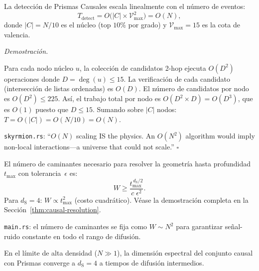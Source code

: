 \documentclass[11pt, a4paper, openany]{book}
\newcommand{\dS}{d_{\mathrm{S}}}
\renewenvironment{proof}[1][Demostraci\'on]{%
  \par\noindent\textit{#1.}\quad
}{\hfill$\square$\par\medskip}
\begin{document}
\begin{theorem}
\label{thm:app-on}
La detecci\'on de Prismas Causales escala linealmente con el
n\'umero de eventos:
\begin{equation}
  T_{\text{detect}}
  = O\bigl(|C| \times \mathcal{V}_{\max}^2\bigr)
  = O(N),
  \label{eq:thm-on}
\end{equation}
donde $|C| = N/10$ es el n\'ucleo (top $10\%$ por grado) y
$\mathcal{V}_{\max} = 15$ es la cota de valencia.
\end{theorem}

\begin{proof}
Para cada nodo n\'ucleo $u$, la colecci\'on de candidatos 2-hop
ejecuta $O(D^2)$ operaciones donde $D = \deg(u) \leq 15$. La
verificaci\'on de cada candidato (intersecci\'on de listas
ordenadas) es $O(D)$. El n\'umero de candidatos por nodo es
$O(D^2) \leq 225$. As\'i, el trabajo total por nodo es
$O(D^2 \times D) = O(D^3)$, que es $O(1)$ puesto que
$D \leq 15$. Sumando sobre $|C|$ nodos:
$T = O(|C|) = O(N/10) = O(N)$.

\medskip\noindent
\texttt{skyrmion.rs}: ``$O(N)$ scaling IS the physics.
An $O(N^2)$ algorithm would imply non-local interactions---a
universe that could not scale.''
\end{proof}

\begin{theorem}
\label{thm:app-resolution}
El n\'umero de caminantes necesario para resolver la geometr\'ia
hasta profundidad $t_{\max}$ con tolerancia~$\epsilon$ es:
\begin{equation}
  W \geq \frac{t_{\max}^{\,\dS/2}}{c\;\epsilon^2}.
\end{equation}
Para $\dS = 4$: $W \propto t_{\max}^2$ (costo cuadr\'atico).
V\'ease la demostraci\'on completa en la
Secci\'on~\ref{thm:causal-resolution}.

\medskip\noindent
\texttt{main.rs}: el n\'umero de caminantes se fija como
$W \sim N^2$ para garantizar se\~nal-ruido constante en todo el
rango de difusi\'on.
\end{theorem}

\begin{theorem}[Dimensi\'on Emergente $\dS \to 4$]
\label{thm:app-emergent-dim}
En el l\'imite de alta densidad ($N \gg 1$), la dimensi\'on
espectral del conjunto causal con Prismas converge a
$\dS = 4$ a tiempos de difusi\'on intermedios.
\end{theorem}
\end{document}
